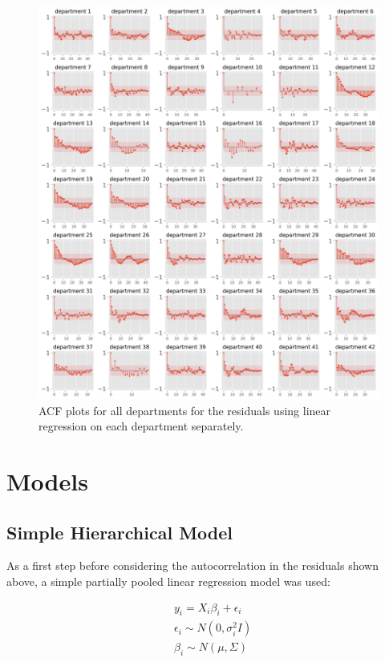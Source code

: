 \documentclass[paper=a4, fontsize=11pt]{scrartcl}
\begin{document}
\begin{figure}[!htb]
\centering
\includegraphics[width=1\textwidth]{acf_plots1.png}
\caption{ACF plots for all departments for the residuals using linear regression on each department separately.}
\label{autocorr}
\end{figure}

\newpage
\section{Models}
\subsection{Simple Hierarchical Model}
As a first step before considering the autocorrelation in the residuals shown above, a simple partially pooled linear regression model was used:


\begin{align*}
    &y_i = X_i \beta_i+ \epsilon_i \\
     &\epsilon_i \sim N(0, \sigma^2_i I)\\
      &\beta_i \sim N(\mu, \Sigma)
\end{align*}
\end{document}
